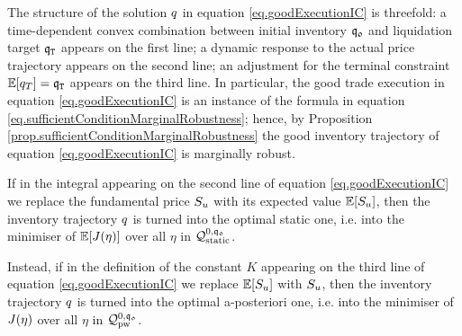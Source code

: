 \documentclass[10pt,a4paper]{article}
\begin{document}
	\begin{remark}\label{remark.turnGoodExecutionIntoStaticAndIntoAposteriori}
		The structure of the solution $q$ in equation \eqref{eq.goodExecutionIC} is threefold: a time-dependent convex combination between initial inventory $\mathfrak{q_0}$ and liquidation target $\mathfrak{q}_{\mathtt{T} }$ appears on the first line; a dynamic response to the actual price trajectory appears on the second line; an adjustment for the terminal constraint $\mathbb{{E}}[q_T]  = \mathfrak{q}_{\mathtt{T} }$ appears on the third line. In particular, the good trade execution in equation \eqref{eq.goodExecutionIC} is an instance of the formula in equation \eqref{eq.sufficientConditionMarginalRobustness}; hence, by Proposition \ref{prop.sufficientConditionMarginalRobustness} the good inventory trajectory of equation \eqref{eq.goodExecutionIC} is marginally robust. 
		
		If in the integral appearing on the second line of equation  \eqref{eq.goodExecutionIC} we replace the fundamental price $S_u$ with its expected value $\mathbb{{E}}[S_u]$, then  the inventory trajectory $q$ is turned into the optimal static one, i.e. into the minimiser of $\mathbb{{E}} [J(\eta)]$ over all $\eta$ in $\mathcal{Q}_{\text{static}}^{0,\mathfrak{q_0}}$.
		
		Instead, if in the definition of the constant  $K$ appearing on  the third line of equation  \eqref{eq.goodExecutionIC} we replace $\mathbb{{E}}[S_u]$ with $S_u$, then the inventory trajectory $q$ is turned into the optimal a-posteriori one, i.e. into the minimiser of $J(\eta)$ over all $\eta$ in $\mathcal{Q}_{\text{pw}}^{0,\mathfrak{q_0}}$. 
	\end{remark}
\end{document}

